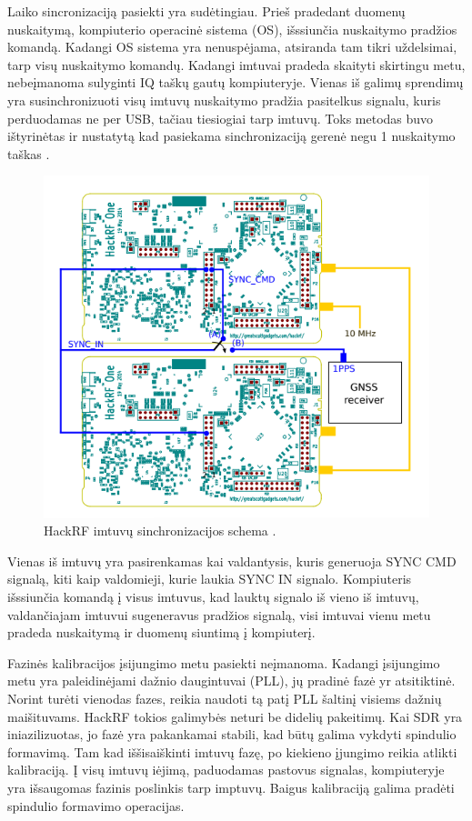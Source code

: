 \documentclass[../gnss_interference_resistant_thesis.tex]{subfiles}
\begin{document}
Laiko sincronizaciją pasiekti yra sudėtingiau. Prieš pradedant duomenų nuskaitymą,
kompiuterio operacinė sistema (OS), išssiunčia nuskaitymo pradžios komandą.
Kadangi OS sistema yra nenuspėjama, atsiranda tam tikri uždelsimai, tarp
visų nuskaitymo komandų. Kadangi imtuvai pradeda skaityti skirtingu metu,
nebeįmanoma sulyginti IQ taškų gautų kompiuteryje. Vienas iš galimų sprendimų
yra susinchronizuoti visų imtuvų nuskaitymo pradžia pasitelkus signalu,
kuris perduodamas ne per USB, tačiau tiesiogiai tarp imtuvų.
Toks metodas buvo ištyrinėtas ir nustatytą kad pasiekama sinchronizaciją
gerenė negu 1 nuskaitymo taškas \cite{hackrf_sync}.

\begin{figure}[h]
    \begin{centering}
    \includegraphics[scale=0.8]{drawings/hackrf_sync}
    \par\end{centering}
    \protect\caption{\label{fig:hackrf_sync}HackRF imtuvų sinchronizacijos schema \cite{hackrf_sync}.}
\end{figure}

Vienas iš imtuvų yra pasirenkamas kai valdantysis, kuris generuoja SYNC CMD signalą,
kiti kaip valdomieji, kurie laukia SYNC IN signalo. Kompiuteris
išssiunčia komandą į visus imtuvus, kad lauktų signalo iš vieno iš imtuvų,
valdančiajam imtuvui sugeneravus pradžios signalą, visi imtuvai vienu metu pradeda
nuskaitymą ir duomenų siuntimą į kompiuterį.

Fazinės kalibracijos įsijungimo metu pasiekti neįmanoma. Kadangi įsijungimo metu yra
paleidinėjami dažnio daugintuvai (PLL), jų pradinė fazė yr atsitiktinė.
Norint turėti vienodas fazes, reikia naudoti tą patį PLL šaltinį visiems
dažnių maišituvams. HackRF tokios galimybės neturi be didelių pakeitimų.
Kai SDR yra iniazilizuotas, jo fazė yra pakankamai stabili, kad būtų galima
vykdyti spindulio formavimą.
Tam kad iššisaiškinti imtuvų fazę, po kiekieno įjungimo reikia atlikti kalibraciją.
Į visų imtuvų iėjimą, paduodamas pastovus signalas, kompiuteryje yra išsaugomas
fazinis poslinkis tarp imptuvų. Baigus kalibraciją galima pradėti spindulio
formavimo operacijas.
\end{document}
